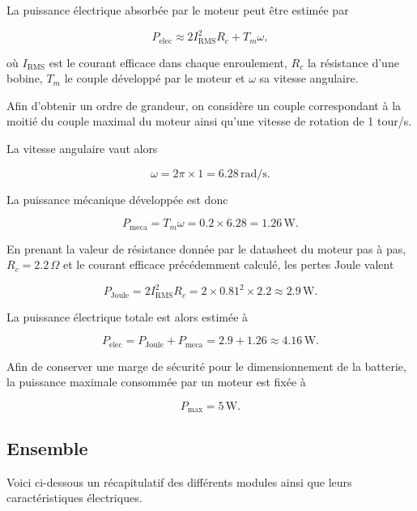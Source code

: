 La puissance électrique absorbée par le moteur peut être estimée par

\begin{equation}
P_{\mathrm{elec}}
\approx
2I_{\mathrm{RMS}}^{2}R_c
+
T_m\omega,
\end{equation}

où $I_{\mathrm{RMS}}$ est le courant efficace dans chaque enroulement,
$R_c$ la résistance d'une bobine,
$T_m$ le couple développé par le moteur et
$\omega$ sa vitesse angulaire.

Afin d'obtenir un ordre de grandeur, on considère un couple correspondant à la moitié du couple maximal du moteur ainsi qu'une vitesse de rotation de
1 tour/s.

La vitesse angulaire vaut alors

\begin{equation}
\omega
=
2\pi\times1
=
6.28\,\si{\radian\per\second}.
\end{equation}

La puissance mécanique développée est donc

\begin{equation}
P_{\mathrm{meca}}
=
T_m\omega
=
0.2\times6.28
=
1.26\,\si{\watt}.
\end{equation}

En prenant la valeur de résistance donnée par le datasheet du moteur pas à pas, 
$R_c=2.2\,\Omega$ et le courant efficace précédemment calculé, les pertes Joule valent

\begin{equation}
P_{\mathrm{Joule}}
=
2I_{\mathrm{RMS}}^2R_c
=
2\times0.81^2\times2.2
\approx
2.9\,\si{\watt}.
\end{equation}

La puissance électrique totale est alors estimée à

\begin{equation}
P_{\mathrm{elec}}
=
P_{\mathrm{Joule}}
+
P_{\mathrm{meca}}
=
2.9
+
1.26
\approx
4.16\,\si{\watt}.
\end{equation}

Afin de conserver une marge de sécurité pour le dimensionnement de la batterie, la puissance maximale consommée par un moteur est fixée à

\begin{equation}
P_{\mathrm{max}} = 5\,\si{\watt}.
\end{equation}
\subsection{Ensemble}
Voici ci-dessous un récapitulatif des différents modules ainsi que leurs caractéristiques électriques.

